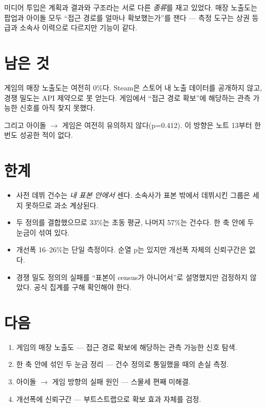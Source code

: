 \documentclass[10pt]{article}
\begin{document}
미디어 투입은 계획과 결과와 구조라는 서로 다른 \emph{종류}를 재고 있었다. 매장
노출도는 팝업과 아이돌 모두 ``접근 경로를 얼마나 확보했는가''를 잰다 --- 측정
도구는 상권 등급과 소속사 이력으로 다르지만 기능이 같다.


\section{남은 것}

게임의 매장 노출도는 여전히 0\%다. Steam은 스토어 내 노출 데이터를 공개하지 않고,
경쟁 밀도는 API 제약으로 못 얻는다. 게임에서 ``접근 경로 확보''에 해당하는 관측
가능한 신호를 아직 찾지 못했다.

그리고 아이돌 $\to$ 게임은 여전히 유의하지 않다(p=0.412). 이 방향은 노트 13부터
한 번도 성공한 적이 없다.

\section{한계}

\begin{itemize}[leftmargin=1.1em,itemsep=0.15em]
\item 사전 데뷔 건수는 \emph{내 표본 안에서} 센다. 소속사가 표본 밖에서 데뷔시킨
      그룹은 세지 못하므로 과소 계상된다.
\item 두 정의를 결합했으므로 33\%는 초동 평균, 나머지 57\%는 건수다. 한 축 안에
      두 눈금이 섞여 있다.
\item 개선폭 16--26\%는 단일 측정이다. 순열 p는 있지만 개선폭 자체의 신뢰구간은 없다.
\item 경쟁 밀도 정의의 실패를 ``표본이 census가 아니어서''로 설명했지만 검정하지
      않았다. 공식 집계를 구해 확인해야 한다.
\end{itemize}

\section{다음}

\begin{enumerate}[leftmargin=1.3em,itemsep=0.15em]
\item 게임의 매장 노출도 --- 접근 경로 확보에 해당하는 관측 가능한 신호 탐색.
\item 한 축 안에 섞인 두 눈금 정리 --- 건수 정의로 통일했을 때의 손실 측정.
\item 아이돌 $\to$ 게임 방향의 실패 원인 --- 스물세 편째 미해결.
\item 개선폭에 신뢰구간 --- 부트스트랩으로 확보 효과 자체를 검정.
\end{enumerate}
\end{document}
